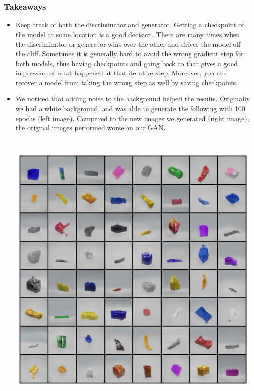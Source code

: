\documentclass[]{article}
\begin{document}
\subsubsection*{Takeaways}
\begin{itemize}
    \item Keep track of both the discriminator and generator. Getting a checkpoint of the model at some location is a good decision. There are many times when the discriminator or generator wins over the other and drives the model off the cliff. Sometimes it is generally hard to avoid the wrong gradient step for both models, thus having checkpoints and going back to that gives a good impression of what happened at that iterative step. Moreover, you can recover a model from taking the wrong step as well by saving checkpoints.  \\
    \item We noticed that adding noise to the background helped the results. Originally we had a white background, and was able to generate the following with 100 epochs (left image). Compared to the new images we generated (right image), the original images performed worse on our GAN. \\ \\ \\
    \hspace*{-1.5cm}
    \includegraphics[scale = 0.4]{imgs/100 epoch gan.png}

\end{itemize}
\end{document}
